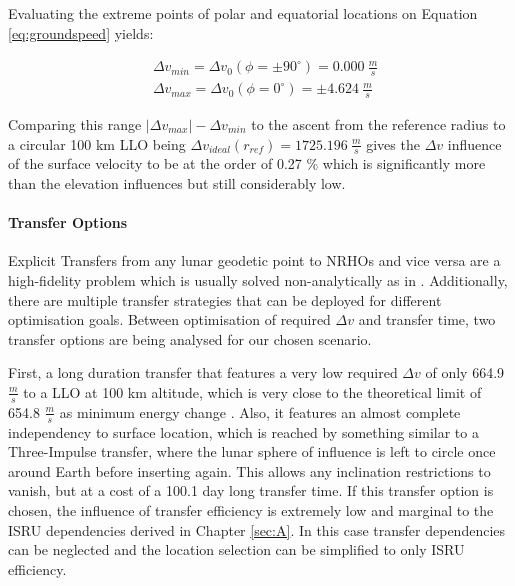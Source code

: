 \documentclass[utf8]{FrontiersinHarvard} %
\begin{document}
Evaluating the extreme points of polar and equatorial locations on Equation \ref{eq:groundspeed} yields:

\begin{equation*}
\begin{array}{ll}
     &  \Delta v_{min}=\Delta v_{0}(\phi= \pm 90^{\circ}) = 0.000 \ \frac{m}{s}\\
     &  \Delta v_{max}=\Delta v_{0}(\phi=0^{\circ}) = \pm 4.624 \ \frac{m}{s}
\end{array}
\label{eq:groundspeed_dv}
\end{equation*}

Comparing this range $|\Delta v_{max}| - \Delta v_{min}$ to the ascent from the reference radius to a circular 100 km LLO being $\Delta v_{ideal}(r_{ref})=1725.196 \ \frac{m}{s}$ gives the $\Delta v$ influence of the surface velocity to be at the order of 0.27 \% which is significantly more than the elevation influences but still considerably low.

\paragraph{Transfer Options}
\label{sec:transfer-options}

Explicit Transfers from any lunar geodetic point to NRHOs and vice versa are a high-fidelity problem which is usually solved non-analytically as in \citep{Trofimov2020}. Additionally, there are multiple transfer strategies that can be deployed for different optimisation goals. Between optimisation of required $\Delta v$ and transfer time, two transfer options are being analysed for our chosen scenario.

First, a long duration transfer that features a very low required $\Delta v$ of only 664.9 $\frac{m}{s}$ to a LLO at 100 km altitude, which is very close to the theoretical limit of 654.8 $\frac{m}{s}$ as minimum energy change \citep{Whitley.2018}. Also, it features an almost complete independency to surface location, which is reached by something similar to a Three-Impulse transfer, where the lunar sphere of influence is left to circle once around Earth before inserting again. This allows any inclination restrictions to vanish, but at a cost of a 100.1 day long transfer time. If this transfer option is chosen, the influence of transfer efficiency is extremely low and marginal to the ISRU dependencies derived in Chapter \ref{sec:A}. In this case transfer dependencies can be neglected and the location selection can be simplified to only ISRU efficiency.
\end{document}
